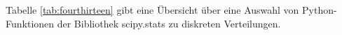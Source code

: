 \begin{table}[H]
{\begin{tabular}{| c | c | c | c | c |}
\parbox[c][0.5in][c]{1.3in}{\centering{}\selectfont{Geometrische Verteilung}} & 
\parbox[c][0.5in][c]{1.1in}{\centering{}\selectfont{geopdf(x,p)}} &
\parbox[c][0.5in][c]{1.1in}{\centering{}\selectfont{geocdf(x,p)}} & 
\parbox[c][0.5in][c]{1.1in}{\centering{}\selectfont{geoinv(P,p)}}  & 
\parbox[c][0.5in][c]{1.4in}{\centering{}\selectfont{geornd(p,m,n)}} \\
\hline

\end{tabular}%
}
\label{tab:fourtwelve}
\end{table}


\noindent Tabelle \ref{tab:fourthirteen} gibt eine \"{U}bersicht \"{u}ber eine Auswahl von Python-Funktionen der Bibliothek scipy.stats zu diskreten Verteilungen.

